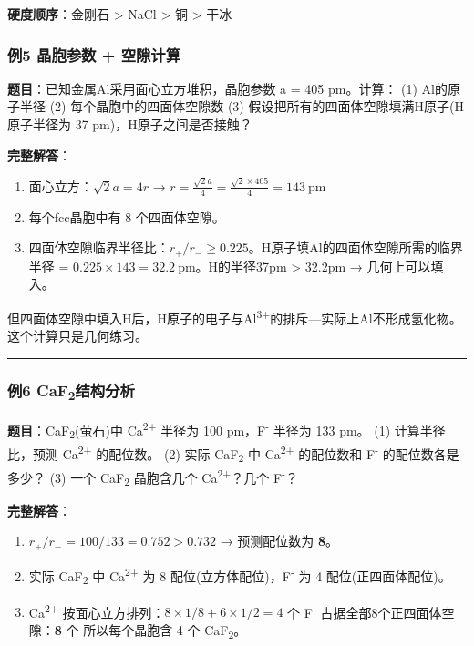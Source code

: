 \textbf{硬度顺序}：金刚石 \textgreater{} NaCl \textgreater{} 铜 \textgreater{} 干冰

\subsubsection{例5 晶胞参数 + 空隙计算}\label{ux4f8b5-ux6676ux80deux53c2ux6570-ux7a7aux9699ux8ba1ux7b97}

\textbf{题目}：已知金属Al采用面心立方堆积，晶胞参数 a = 405 pm。计算：
(1) Al的原子半径
(2) 每个晶胞中的四面体空隙数
(3) 假设把所有的四面体空隙填满H原子(H原子半径为 37 pm)，H原子之间是否接触？

\textbf{完整解答}：

\begin{enumerate}
\def\labelenumi{(\arabic{enumi})}
\item
  面心立方：\(\sqrt{2}a = 4r\) → \(r = \frac{\sqrt{2}a}{4} = \frac{\sqrt{2} \times 405}{4} = 143\ \mathrm{pm}\)
\item
  每个fcc晶胞中有 8 个四面体空隙。
\item
  四面体空隙临界半径比：\(r_+/r_- \geq 0.225\)。H原子填Al的四面体空隙所需的临界半径 = \(0.225 \times 143 = 32.2\ \mathrm{pm}\)。H的半径37pm \textgreater{} 32.2pm → 几何上可以填入。
\end{enumerate}

但四面体空隙中填入H后，H原子的电子与Al\textsuperscript{3+}的排斥---实际上Al不形成氢化物。这个计算只是几何练习。

\begin{center}\rule{0.5\linewidth}{0.5pt}\end{center}

\subsubsection{\texorpdfstring{例6 CaF\textsubscript{2}结构分析}{例6 CaF2结构分析}}\label{ux4f8b6-caf2ux7ed3ux6784ux5206ux6790}

\textbf{题目}：CaF\textsubscript{2}(萤石)中 Ca\textsuperscript{2+} 半径为 100 pm，F\textsuperscript{-} 半径为 133 pm。
(1) 计算半径比，预测 Ca\textsuperscript{2+} 的配位数。
(2) 实际 CaF\textsubscript{2} 中 Ca\textsuperscript{2+} 的配位数和 F\textsuperscript{-} 的配位数各是多少？
(3) 一个 CaF\textsubscript{2} 晶胞含几个 Ca\textsuperscript{2+}？几个 F\textsuperscript{-}？

\textbf{完整解答}：

\begin{enumerate}
\def\labelenumi{(\arabic{enumi})}
\item
  \(r_+/r_- = 100/133 = 0.752 > 0.732\) → 预测配位数为 \textbf{8}。
\item
  实际 CaF\textsubscript{2} 中 Ca\textsuperscript{2+} 为 8 配位(立方体配位)，F\textsuperscript{-} 为 4 配位(正四面体配位)。
\item
  Ca\textsuperscript{2+} 按面心立方排列：\(8 \times 1/8 + 6 \times 1/2 = 4\) 个
  F\textsuperscript{-} 占据全部8个正四面体空隙：\textbf{8} 个
  所以每个晶胞含 4 个 CaF\textsubscript{2}。
\end{enumerate}

